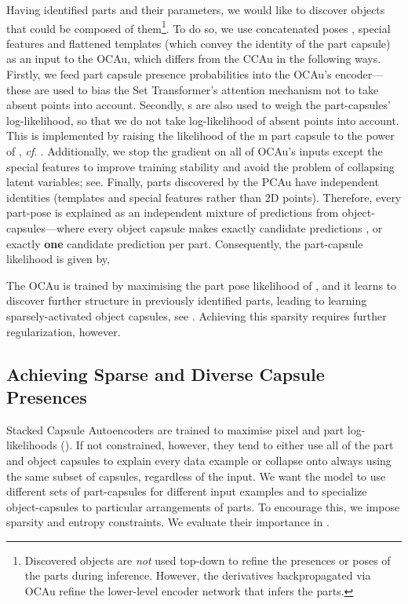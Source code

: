 \documentclass{article}
\begin{document}
Having identified parts and their parameters, we would like to discover objects that could be composed of them\footnote{
	Discovered objects are {\it not} used top-down to refine the presences or poses of the parts during inference. However, the derivatives backpropagated via \gls{OCAu} refine the lower-level encoder network that infers the parts.
}.
To do so, we use concatenated poses , special features  and flattened templates  (which convey the identity of the part capsule)
as an input to the \gls{OCAu}, which differs from the \gls{CCAu} in the following ways.
Firstly, we feed part capsule presence probabilities  into the \gls{OCAu}'s encoder---these are used to bias the Set Transformer's attention mechanism not to take absent points into account.
Secondly, s are also used to weigh the part-capsules' log-likelihood, so that we do not take log-likelihood of absent points into account. 
This is implemented by raising the likelihood of the m part capsule to the power of , \textit{cf}. .
Additionally, we stop the gradient on all of \gls{OCAu}'s inputs except the special features to improve training stability and avoid the problem of collapsing latent variables; see\eg \cite{Rasmus2015ladder}.
Finally, parts discovered by the \gls{PCAu} have independent identities (templates and special features rather than 2D points).
Therefore, every part-pose is explained as an independent mixture of predictions from object-capsules---where every object capsule makes exactly  candidate predictions , or exactly {\bf one} candidate prediction per part.
Consequently, the part-capsule likelihood is given by,

The \gls{OCAu} is trained by maximising the part pose likelihood of , and it learns to discover further structure in previously identified parts, leading to learning sparsely-activated object capsules, see .
Achieving this sparsity requires further regularization, however.

\subsection{Achieving Sparse and Diverse Capsule Presences}
\label{sec:losses}
Stacked Capsule Autoencoders are trained to maximise pixel and part log-likelihoods ().
If not constrained, however, they tend to either use all of the part and object capsules to explain every data example or collapse onto always using the same subset of capsules, regardless of the input.
We want the model to use different sets of part-capsules for different input examples and to specialize object-capsules to particular arrangements of parts. 
To encourage this, we impose sparsity and entropy constraints.  We evaluate their importance in .
\end{document}
